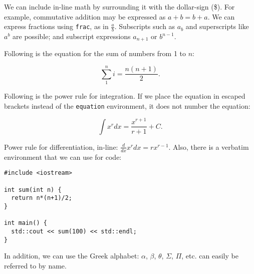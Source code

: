 \documentclass{article}
\begin{document}
We can include in-line math by surrounding it with the dollar-sign (\$).  For
example, commutative addition may be expressed as $a+b=b+a$. We can express
fractions using \texttt{frac}, as in $\frac{a}{b}$. Subscripts such as $a_b$
and superscripts like $a^b$ are possible; and subscript expressions $a_{n+1}$
or $b^{n-1}$.

Following is the equation for the sum of numbers from 1 to $n$:

\begin{equation}
  \displaystyle\sum_1^n i = \frac{n(n+1)}{2}.
\end{equation}

Following is the power rule for integration. If we place the equation in
escaped brackets instead of the \texttt{equation} environment, it does not
number the equation:

\[
  \int x^r dx = \frac{x^{r+1}}{r+1} + C.
\]

Power rule for differentiation, in-line: $\frac{d}{dx} x^r dx = rx^{r-1}$.
Also, there is a verbatim environment that we can use for code:

\begin{verbatim}
#include <iostream>

int sum(int n) {
  return n*(n+1)/2;
}

int main() {
  std::cout << sum(100) << std::endl;
}
\end{verbatim}

In addition, we can use the Greek alphabet: $\alpha$, $\beta$, $\theta$,
$\Sigma$, $\Pi$, etc. can easily be referred to by name. 
\end{document}
